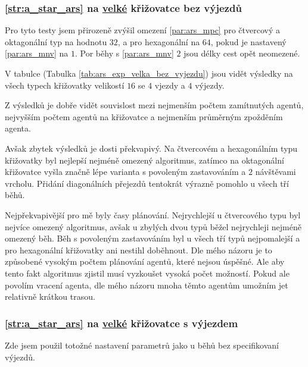 

\subsubsection{\ref{str:a_star_ars} na \hyperref[par:data_velka]{velké} křižovatce bez výjezdů}
\label{subsubsec:exp_ars_velka_krizovatka_bez_vyjezdu}

Pro tyto testy jsem přirozeně zvýšil omezení \ref{par:ars_mpc} pro čtvercový a oktagonální typ na hodnotu $32$,
a pro hexagonální na $64$, pokud je nastavený \ref{par:ars_mnv} na $1$.
Por běhy s \ref{par:ars_mnv} $2$ jsou délky cest opět neomezené.

V tabulce (Tabulka \ref{tab:ars_exp_velka_bez_vyjezdu}) jsou vidět výsledky na všech typech křižovatky
velikostí $16$ se $4$ vjezdy a $4$ výjezdy.

Z výsledků je dobře vidět souvislost mezi nejmenším počtem zamítnutých agentů, nejvyšším počtem agentů na křižovatce a
nejmenším průměrným zpožděním agenta.

Avšak zbytek výsledků je dosti překvapivý.
Na čtvercovém a hexagonálním typu křižovatky byl nejlepší nejméně omezený algoritmus,
zatímco na oktagonální křižovatce vyšla značně lépe varianta s povoleným zastavováním a $2$ návštěvami vrcholu.
Přidání diagonálních přejezdů tentokrát výrazně pomohlo u všech tří běhů.

Nejpřekvapivější pro mě byly časy plánování.
Nejrychlejší u čtvercového typu byl nejvíce omezený algoritmus,
avšak u zbylých dvou typů běžel nejrychleji nejméně omezený běh.
Běh s povoleným zastavováním byl u všech tří typů nejpomalejší a pro hexagonální křižovatky ani nestihl doběhnout.
Dle mého názoru je to způsobené vysokým počtem plánování agentů, které nejsou úspěšné.
Ale aby tento fakt algoritmus zjistil musí vyzkoušet vysoká počet možností.
Pokud ale povolím vracení agenta, dle mého názoru mnoha těmto agentům umožním jet relativně krátkou trasou.



\subsubsection{\ref{str:a_star_ars} na \hyperref[par:data_velka]{velké} křižovatce s výjezdem}
\label{subsubsec:exp_ars_velka_krizovatka_s_vyjezdem}

Zde jsem použil totožné nastavení parametrů jako u běhů bez specifikovaní výjezdů.

